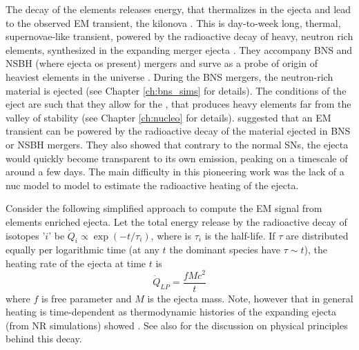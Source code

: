The decay of the \rproc{} elements releases energy, that thermalizes in the ejecta 
and lead to the observed \ac{EM} transient, the kilonova \citep[\eg][]{Metzger:2016pju}.
%
This is day-to-week long, thermal, supernovae-like transient, powered by the 
radioactive decay of heavy, neutron rich elements, synthesized in the expanding 
merger ejecta \citep{Li:1998bw}. They accompany \ac{BNS} and \ac{NSBH} 
(where ejecta os present) mergers and surve as a probe of origin of heaviest
 elements in the universe \citep{Metzger:2010}.
%
During the \ac{BNS} mergers, the neutron-rich material is ejected (see Chapter \ref{ch:bns_sims} for details).
The conditions of the eject are such that they allow for the \rproc{}, that produces heavy elements 
far from the valley of stability (see Chapter \ref{ch:nucleo} for details).
\citet{Li:1998bw} suggested that an \ac{EM} transient can be powered by the radioactive decay 
of the material ejected in \ac{BNS} or \ac{NSBH} mergers. They also showed that contrary to the normal \acp{SN}, 
the ejecta would quickly become transparent to its own emission, peaking on a timescale of around a few days. 
The main difficulty in this pioneering work was the lack of a \ac{nuc} model to 
model to estimate the radioactive heating of the ejecta. 



Consider the following simplified approach to compute the \ac{EM} signal from \rproc{}
elements enriched ejecta. Let the total energy release by the radioactive decay of isotopes 
'$i$' be $\dot{Q}_i \propto \exp(-t/\tau_i)$, where is $\tau_i$ is the half-life. If $\tau$ 
are distributed equally per logarithmic time (at any $t$ the dominant species have $\tau\sim t$), 
the heating rate of the ejecta at time $t$ is
%
\begin{equation}
\dot{Q}_{LP} = \frac{f M c^2}{t}
\end{equation}
%
where $f$ is free parameter and $M$ is the ejecta mass.
%
Note, however that in general heating is time-dependent as thermodynamic histories of the expanding 
ejecta (from \ac{NR} simulations) showed \citep{Metzger:2010,Roberts:2011,Korobkin:2012uy}.
See also \citet{Hotokezaka:2017dbk} for the discussion on physical principles behind this decay.
%

